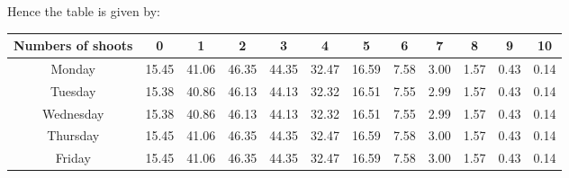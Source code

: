 \documentclass[a4paper]{article}
\begin{document}
Hence the table is given by:
\begin{table}[!htbp]
  \centering
    \begin{tabular}{|c|c|c|c|c|c|c|c|c|c|c|c|}
    \hline
    \rowcolor[rgb]{ .867,  .922,  .969} Numbers of shoots & 0     & 1     & 2     & 3     & 4     & 5     & 6     & 7     & 8     & 9     & 10 \\
    \hline
    \rowcolor[rgb]{ .867,  .922,  .969} Monday & \cellcolor[rgb]{ 1,  1,  1}15.45  & \cellcolor[rgb]{ 1,  1,  1}41.06  & \cellcolor[rgb]{ 1,  1,  1}46.35  & \cellcolor[rgb]{ 1,  1,  1}44.35  & \cellcolor[rgb]{ 1,  1,  1}32.47  & \cellcolor[rgb]{ 1,  1,  1}16.59  & \cellcolor[rgb]{ 1,  1,  1}7.58  & \cellcolor[rgb]{ 1,  1,  1}3.00  & \cellcolor[rgb]{ 1,  1,  1}1.57  & \cellcolor[rgb]{ 1,  1,  1}0.43  & \cellcolor[rgb]{ 1,  1,  1}0.14  \\
    \hline
    \rowcolor[rgb]{ .867,  .922,  .969} Tuesday & \cellcolor[rgb]{ 1,  1,  1}15.38  & \cellcolor[rgb]{ 1,  1,  1}40.86  & \cellcolor[rgb]{ 1,  1,  1}46.13  & \cellcolor[rgb]{ 1,  1,  1}44.13  & \cellcolor[rgb]{ 1,  1,  1}32.32  & \cellcolor[rgb]{ 1,  1,  1}16.51  & \cellcolor[rgb]{ 1,  1,  1}7.55  & \cellcolor[rgb]{ 1,  1,  1}2.99  & \cellcolor[rgb]{ 1,  1,  1}1.57  & \cellcolor[rgb]{ 1,  1,  1}0.43  & \cellcolor[rgb]{ 1,  1,  1}0.14  \\
    \hline
    \rowcolor[rgb]{ .867,  .922,  .969} Wednesday & \cellcolor[rgb]{ 1,  1,  1}15.38  & \cellcolor[rgb]{ 1,  1,  1}40.86  & \cellcolor[rgb]{ 1,  1,  1}46.13  & \cellcolor[rgb]{ 1,  1,  1}44.13  & \cellcolor[rgb]{ 1,  1,  1}32.32  & \cellcolor[rgb]{ 1,  1,  1}16.51  & \cellcolor[rgb]{ 1,  1,  1}7.55  & \cellcolor[rgb]{ 1,  1,  1}2.99  & \cellcolor[rgb]{ 1,  1,  1}1.57  & \cellcolor[rgb]{ 1,  1,  1}0.43  & \cellcolor[rgb]{ 1,  1,  1}0.14  \\
    \hline
    \rowcolor[rgb]{ .867,  .922,  .969} Thursday & \cellcolor[rgb]{ 1,  1,  1}15.45  & \cellcolor[rgb]{ 1,  1,  1}41.06  & \cellcolor[rgb]{ 1,  1,  1}46.35  & \cellcolor[rgb]{ 1,  1,  1}44.35  & \cellcolor[rgb]{ 1,  1,  1}32.47  & \cellcolor[rgb]{ 1,  1,  1}16.59  & \cellcolor[rgb]{ 1,  1,  1}7.58  & \cellcolor[rgb]{ 1,  1,  1}3.00  & \cellcolor[rgb]{ 1,  1,  1}1.57  & \cellcolor[rgb]{ 1,  1,  1}0.43  & \cellcolor[rgb]{ 1,  1,  1}0.14  \\
    \hline
    \rowcolor[rgb]{ .867,  .922,  .969} Friday & \cellcolor[rgb]{ 1,  1,  1}15.45  & \cellcolor[rgb]{ 1,  1,  1}41.06  & \cellcolor[rgb]{ 1,  1,  1}46.35  & \cellcolor[rgb]{ 1,  1,  1}44.35  & \cellcolor[rgb]{ 1,  1,  1}32.47  & \cellcolor[rgb]{ 1,  1,  1}16.59  & \cellcolor[rgb]{ 1,  1,  1}7.58  & \cellcolor[rgb]{ 1,  1,  1}3.00  & \cellcolor[rgb]{ 1,  1,  1}1.57  & \cellcolor[rgb]{ 1,  1,  1}0.43  & \cellcolor[rgb]{ 1,  1,  1}0.14  \\

\end{tabular}
\end{table}
\end{document}
